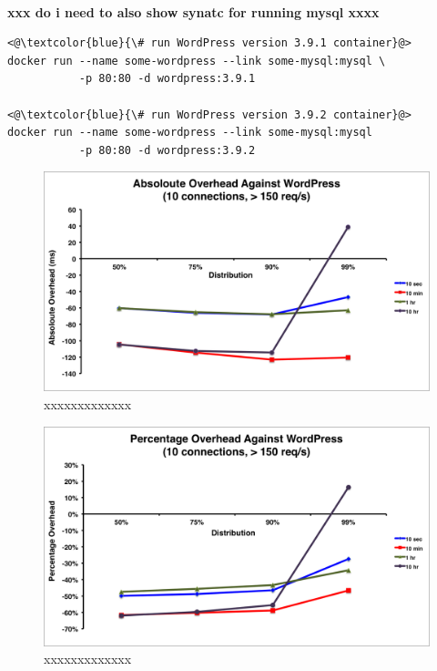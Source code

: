 \documentclass[a4paper,11pt,twoside]{report}
\begin{document}
\noindent\\
\textbf{xxx do i need to also show synatc for running mysql xxxx}
\begin{lstlisting}[language=terminal]
<@\textcolor{blue}{\# run WordPress version 3.9.1 container}@>
docker run --name some-wordpress --link some-mysql:mysql \
           -p 80:80 -d wordpress:3.9.1

<@\textcolor{blue}{\# run WordPress version 3.9.2 container}@>
docker run --name some-wordpress --link some-mysql:mysql 
           -p 80:80 -d wordpress:3.9.2
\end{lstlisting}

\begin{figure}[!ht]
  \centering
     \includegraphics[scale=0.55]{absoloute-wordpress}
  \caption{xxxxxxxxxxxxx}
  \label{absoloute-wordpress}
\end{figure} 

\begin{figure}[!ht]
  \centering
     \includegraphics[scale=0.55]{percentage-wordpress}
  \caption{xxxxxxxxxxxxx}
  \label{percentage-wordpress}
\end{figure} 
\end{document}
